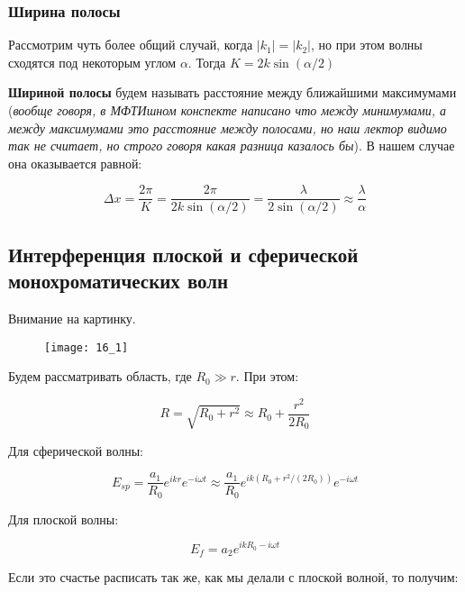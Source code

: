 \subsubsection{Ширина полосы}

Рассмотрим чуть более общий случай, когда $|k_1| = |k_2|$, но при этом волны сходятся под некоторым углом $\alpha$. Тогда $K = 2 k \sin(\alpha/2)$

\textbf{Шириной полосы} будем называть расстояние между ближайшими максимумами (\textit{вообще говоря, в МФТИшном конспекте написано что между минимумами, а между максимумами это расстояние между полосами, но наш лектор видимо так не считает, но строго говоря какая разница казалось бы}). В нашем случае она оказывается равной:

\begin{equation*}
	\Delta x = \frac{2\pi}{K} = \frac{2 \pi}{2 k \sin(\alpha/2)} = \frac{\lambda}{2\sin(\alpha/2)} \approx \frac{\lambda}{\alpha}
\end{equation*}

\subsection{Интерференция плоской и сферической монохроматических волн}

Внимание на картинку.

\begin{figure}[H]
	\centering
	\texttt{[image: 16\_1]}
\end{figure}

Будем рассматривать область, где $R_0 \gg r$. При этом:

\begin{equation*}
	R = \sqrt{R_0 + r^2} \approx R_0 + \frac{r^2}{2R_0}
\end{equation*}

Для сферической волны:

\begin{equation*}
	E_{sp} = \frac{a_1}{R_0} e^{i k r} e^{-i \omega t} \approx \frac{a_1}{R_0} e^{i k (R_0 + r^2 / (2 R_0))} e^{-i \omega t}
\end{equation*}

Для плоской волны:

\begin{equation*}
	E_{f} = a_2 e^{i k R_0  - i \omega t}
\end{equation*}

Если это счастье расписать так же, как мы делали с плоской волной, то получим:


